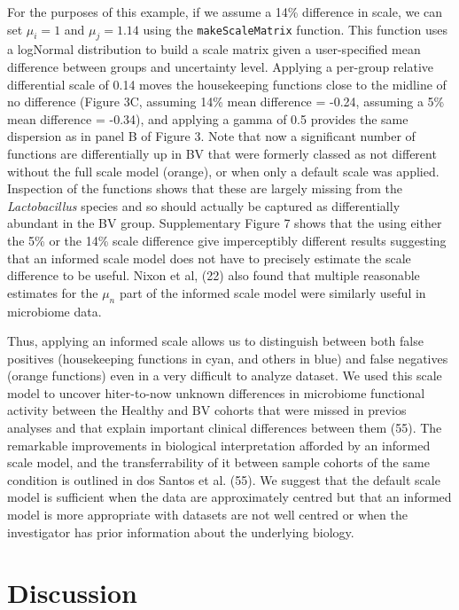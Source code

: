 \documentclass[
]{article}
\begin{document}
For the purposes of this example, if we assume a 14\% difference in
scale, we can set \(\mu_i = 1\) and \(\mu_j = 1.14\) using the
\texttt{makeScaleMatrix} function. This function uses a logNormal
distribution to build a scale matrix given a user-specified mean
difference between groups and uncertainty level. Applying a per-group
relative differential scale of 0.14 moves the housekeeping functions
close to the midline of no difference (Figure 3C, assuming 14\% mean
difference = -0.24, assuming a 5\% mean difference = -0.34), and
applying a gamma of 0.5 provides the same dispersion as in panel B of
Figure 3. Note that now a significant number of functions are
differentially up in BV that were formerly classed as not different
without the full scale model (orange), or when only a default scale was
applied. Inspection of the functions shows that these are largely
missing from the \emph{Lactobacillus} species and so should actually be
captured as differentially abundant in the BV group. Supplementary
Figure 7 shows that the using either the 5\% or the 14\% scale
difference give imperceptibly different results suggesting that an
informed scale model does not have to precisely estimate the scale
difference to be useful. Nixon et al, (22) also found that multiple
reasonable estimates for the \(\mu_n\) part of the informed scale model
were similarly useful in microbiome data.

Thus, applying an informed scale allows us to distinguish between both
false positives (housekeeping functions in cyan, and others in blue) and
false negatives (orange functions) even in a very difficult to analyze
dataset. We used this scale model to uncover hiter-to-now unknown
differences in microbiome functional activity between the Healthy and BV
cohorts that were missed in previos analyses and that explain important
clinical differences between them (55). The remarkable improvements in
biological interpretation afforded by an informed scale model, and the
transferrability of it between sample cohorts of the same condition is
outlined in dos Santos et al. (55). We suggest that the default scale
model is sufficient when the data are approximately centred but that an
informed model is more appropriate with datasets are not well centred or
when the investigator has prior information about the underlying
biology.

\section{Discussion}\label{discussion}
\end{document}
